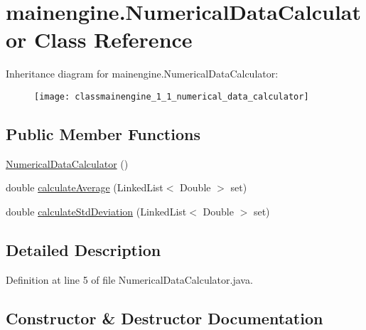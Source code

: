\hypertarget{classmainengine_1_1_numerical_data_calculator}{}\section{mainengine.\+Numerical\+Data\+Calculator Class Reference}
\label{classmainengine_1_1_numerical_data_calculator}
Inheritance diagram for mainengine.\+Numerical\+Data\+Calculator\+:\begin{figure}[H]
\begin{center}
\leavevmode
\texttt{[image: classmainengine\_1\_1\_numerical\_data\_calculator]}
\end{center}
\end{figure}
\subsection*{Public Member Functions}
\begin{DoxyCompactItemize}
\item 
\hyperlink{classmainengine_1_1_numerical_data_calculator_aa9166a8e6a28ab6eeab9859c2b7b2701}{Numerical\+Data\+Calculator} ()
\item 
double \hyperlink{classmainengine_1_1_numerical_data_calculator_ac1f0d9cc0a35c84dc092b4c8b4fcd3ed}{calculate\+Average} (Linked\+List$<$ Double $>$ set)
\item 
double \hyperlink{classmainengine_1_1_numerical_data_calculator_ab0ceb7615ed1d5df5b1cae8d47895e7a}{calculate\+Std\+Deviation} (Linked\+List$<$ Double $>$ set)
\end{DoxyCompactItemize}


\subsection{Detailed Description}


Definition at line 5 of file Numerical\+Data\+Calculator.\+java.



\subsection{Constructor \& Destructor Documentation}
\hypertarget{classmainengine_1_1_numerical_data_calculator_aa9166a8e6a28ab6eeab9859c2b7b2701}{}\label{classmainengine_1_1_numerical_data_calculator_aa9166a8e6a28ab6eeab9859c2b7b2701} 
